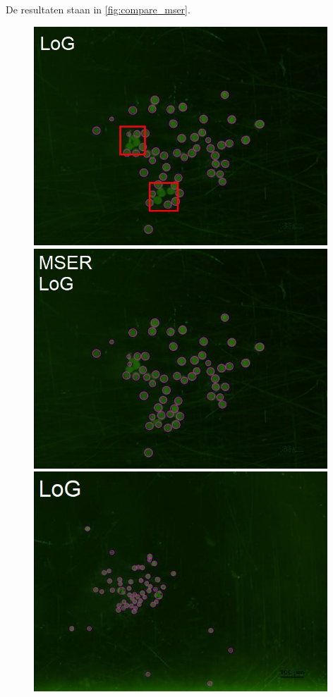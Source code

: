 \documentclass{article}
\begin{document}
\begin{multicols}{2}
De resultaten staan in \autoref{fig:compare_mser}.

\begin{figure}[H]
\centering
\includegraphics[width=0.98\textwidth]{images/log_no_mser_bad.JPG}
\includegraphics[width=0.98\textwidth]{images/log_mser_good.jpg}
\includegraphics[width=0.98\textwidth]{images/log_no_mser_good.JPG}

\end{figure}
\end{multicols}
\end{document}
